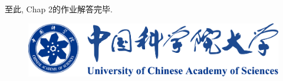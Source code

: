 \documentclass{article}
\begin{document}
\begin{homeworkProblem}
	至此, Chap 2的作业解答完毕.
	\begin{figure}[H]  %
		\centering
		\includegraphics[width=0.7\linewidth]{images/title/ucas_logo 1.pdf}
		\label{fig:ucas-logo}
	\end{figure}
\end{homeworkProblem}




\end{document}
